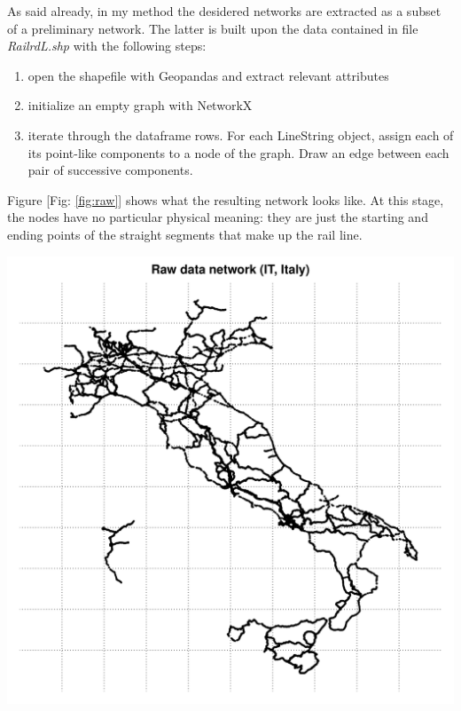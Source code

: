 As said already, in my method the desidered networks are extracted as a subset of a preliminary network. 
The latter is built upon the data contained in file \textit{RailrdL.shp} with the following steps:
\newline \noindent
\begin{minipage}{0.5\textwidth}
\begin{enumerate}
    \item open the shapefile with Geopandas and extract relevant attributes
     \item initialize an empty graph with NetworkX
     \item iterate through the dataframe rows. For each LineString object, assign each of its point-like components to a node of the graph. Draw an edge between each pair of successive components.
\end{enumerate}
Figure [Fig: \ref{fig:raw}] shows what the resulting network looks like. At this stage, the nodes have no particular physical meaning: they are just the starting and ending points of the straight segments that make up the rail line.
\end{minipage}
\hfill
\begin{minipage}{0.48\textwidth}
    \includegraphics[width = \textwidth]{latex_source/images/railways/raw_networks/raw_IT_network.pdf}
    \label{fig:raw}
\end{minipage}



